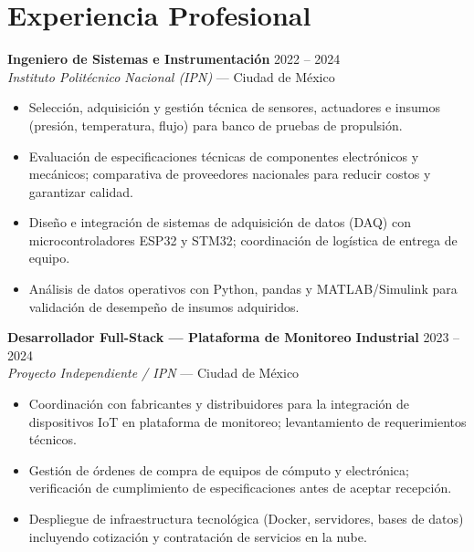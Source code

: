 \documentclass[10pt, letterpaper]{article}
\begin{document}
\section{Experiencia Profesional}

\noindent
\textbf{Ingeniero de Sistemas e Instrumentación} \hfill
\textcolor{gris}{2022 – 2024}\\
\textit{Instituto Politécnico Nacional (IPN)} — Ciudad de México
\begin{itemize}
  \item Selección, adquisición y gestión técnica de sensores, actuadores e insumos
        (presión, temperatura, flujo) para banco de pruebas de propulsión.
  \item Evaluación de especificaciones técnicas de componentes electrónicos y mecánicos;
        comparativa de proveedores nacionales para reducir costos y garantizar calidad.
  \item Diseño e integración de sistemas de adquisición de datos (DAQ) con
        microcontroladores ESP32 y STM32; coordinación de logística de entrega de equipo.
  \item Análisis de datos operativos con Python, pandas y MATLAB/Simulink para validación
        de desempeño de insumos adquiridos.
\end{itemize}

\vspace{4pt}
\noindent
\textbf{Desarrollador Full-Stack — Plataforma de Monitoreo Industrial} \hfill
\textcolor{gris}{2023 – 2024}\\
\textit{Proyecto Independiente / IPN} — Ciudad de México
\begin{itemize}
  \item Coordinación con fabricantes y distribuidores para la integración de dispositivos
        IoT en plataforma de monitoreo; levantamiento de requerimientos técnicos.
  \item Gestión de órdenes de compra de equipos de cómputo y electrónica; verificación de
        cumplimiento de especificaciones antes de aceptar recepción.
  \item Despliegue de infraestructura tecnológica (Docker, servidores, bases de datos)
        incluyendo cotización y contratación de servicios en la nube.
\end{itemize}
\end{document}
